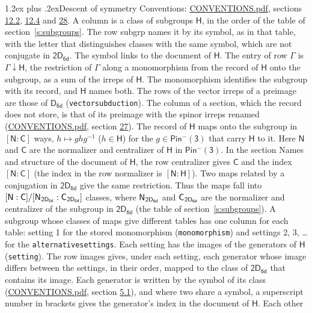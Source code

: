 \documentclass[10pt,a4paper]{article}
\makeatletter
\renewcommand\section{\@startsection{section}{1}{\z@}{-3ex plus -1ex minus -.2ex}%
  {1.2ex plus .2ex}{\normalfont\large\sffamily\bfseries\color{parttitle}}}
\numberwithin{equation}{section}
\newcommand{\grp}[1]{\mathsf{#1}}
\newcommand{\grpindex}[2]{[#1 : #2]}
\newcommand{\restr}[2]{#1\!\downarrow#2}
\newcommand{\hairsp}{\mkern1mu}
\makeatother
\begin{document}
\section{Descent of symmetry}\label{s:subduction}
Conventions: \href{../../CONVENTIONS.pdf}{CONVENTIONS.pdf}, sections \href{../../../rotation/CONVENTIONS.pdf\#conv.12.2}{12.2}, \href{../../../rotation/CONVENTIONS.pdf\#conv.12.4}{12.4} and \href{../../CONVENTIONS.pdf\#conv.28}{28}.
A column is a class of subgroups $\grp{H}$, in the order of the table of section~\ref{s:subgroups}. The row subgrp names it by its symbol, as in that table, with the letter that distinguishes classes with the same symbol, which are not conjugate in $\grp{2D_{6d}}$. The symbol links to the document of $\grp{H}$. The entry of row $\Gamma$ is $\restr{\Gamma}{\grp{H}}$, the restriction of $\Gamma$ along a monomorphism from the record of $\grp{H}$ onto the subgroup, as a sum of the irreps of $\grp{H}$. The monomorphism identifies the subgroup with its record, and $\grp{H}$ names both. The rows of the vector irreps of a preimage are those of \href{../../../rotation/data/pdf/D6d.pdf}{$\grp{D_{6d}}$} (\texttt{vectorsubduction}). The column of a section, which the record does not store, is that of its preimage with the spinor irreps renamed (\href{../../CONVENTIONS.pdf}{CONVENTIONS.pdf}, section \href{../../CONVENTIONS.pdf\#conv.27}{27}). \label{n:group.normalizer.o3}\label{n:group.centralizer.o3}\label{n:element.h}The record of $\grp{H}$ maps onto the subgroup in $\grpindex{\grp{N}}{\grp{C}}$ ways, $h \mapsto g h g^{-1}$ ($h \in \grp{H}$) for the $g \in \grp{Pin^{-}(3)}$ that carry $\grp{H}$ to it. Here $\grp{N}$ and $\grp{C}$ are the normalizer and centralizer of $\grp{H}$ in \href{Pinminus3.pdf}{$\grp{Pin^{-}(3)}$}. In the section Names and structure of the document of $\grp{H}$, the row centralizer gives $\grp{C}$ and the index $\grpindex{\grp{N}}{\grp{C}}$ (the index in the row normalizer is $\grpindex{\grp{N}}{\grp{H}}$). Two maps related by a conjugation in $\grp{2D_{6d}}$ give the same restriction. Thus the maps fall into $\grpindex{\grp{N}}{\grp{C}}/\grpindex{\grp{N}_{\hairsp \grp{2D_{6d}}}}{\grp{C}_{\hairsp \grp{2D_{6d}}}}$ classes, where $\grp{N}_{\hairsp \grp{2D_{6d}}}$ and $\grp{C}_{\hairsp \grp{2D_{6d}}}$ are the normalizer and centralizer of the subgroup in $\grp{2D_{6d}}$ (the table of section~\ref{s:subgroups}). \label{n:head.setting}A subgroup whose classes of maps give different tables has one column for each table: setting 1 for the stored monomorphism (\texttt{monomorphism}) and settings 2, 3, \dots{} for the \texttt{alternativesettings}. Each setting has the images of the generators of $\grp{H}$ (\texttt{setting}). \label{n:head.images}The row images gives, under each setting, each generator whose image differs between the settings, in their order, mapped to the class of $\grp{2D_{6d}}$ that contains its image. \label{n:element.generator.index}Each generator is written by the symbol of its class (\href{../../CONVENTIONS.pdf}{CONVENTIONS.pdf}, section \href{../../../rotation/CONVENTIONS.pdf\#conv.5.1}{5.1}), and where two share a symbol, a superscript number in brackets gives the generator's index in the document of $\grp{H}$. \label{n:irrep.Delta}Each other 
\end{document}
